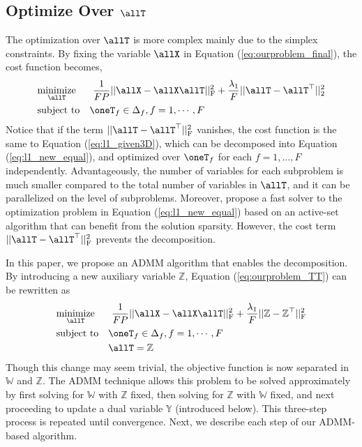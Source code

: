 \subsection{Optimize Over \texorpdfstring{$\allT$}{optimizeoverallT}} \label{sec:initlization}
The optimization over $\allT$ is more complex mainly due to the simplex constraints.
By fixing the variable $\allX$ in Equation (\ref{eq:ourproblem_final}), the cost function becomes,
\begin{equation}
\begin{aligned}
& \underset{ \allT }{\text{minimize}}&& ~ \frac{1}{FP} || \allX - \allX \allT||_\text{F}^2
 + \frac{\lambda_1}{F} ||\allT - \allT^\top||_2^2 \\
& \text{subject to} && \oneT_f \in \Delta_f, f=1,\cdots,F
\end{aligned}
\label{eq:ourproblem_TT}
\end{equation}
Notice that if the term $||\allT - \allT^\top||_\text{F}^2$ vanishes, the cost function is the same to Equation (\ref{eq:l1_given3D}), which can be decomposed into Equation (\ref{eq:l1_new_equal}), and optimized over $\oneT_f$ for each $f=1,\dots,F$ independently.
Advantageously, the number of variables for each subproblem is much smaller compared to the total number of variables in $\allT$, and it can be parallelized on the level of subproblems.
Moreover, \citet{chen:hal-00995911} propose a fast solver to the optimization problem in Equation (\ref{eq:l1_new_equal}) based on an active-set algorithm that can benefit from the solution sparsity.
However, the cost term $||\allT - \allT^\top||_\text{F}^2$ prevents the decomposition.

In this paper, we propose an ADMM algorithm that enables the decomposition.
By introducing a new auxiliary variable $\mathbb{Z}$, Equation (\ref{eq:ourproblem_TT}) can be rewritten as
\begin{equation}
\begin{aligned}
& \underset{ \allT }{\text{minimize}}&& ~ \frac{1}{FP} || \allX - \allX \allT||_\text{F}^2
 + \frac{\lambda_1}{F} ||\mathbb{Z} - \mathbb{Z}^\top||_\text{F}^2 \\
& \text{subject to} && \oneT_f \in \Delta_f, f=1,\cdots,F \\
&                   && \allT = \mathbb{Z}
\end{aligned}
\end{equation}
Though this change may seem trivial, the objective function is now separated in $\mathbb{W}$ and $\mathbb{Z}$. 
The ADMM technique allows this problem to be solved approximately by first solving for $\mathbb{W}$ with $\mathbb{Z}$ fixed, then solving for $\mathbb{Z}$ with $\mathbb{W}$ fixed, and next proceeding to update a dual variable $\mathbb{Y}$ (introduced below). This three-step process is repeated until convergence. Next, we describe each step of our ADMM-based algorithm. 

